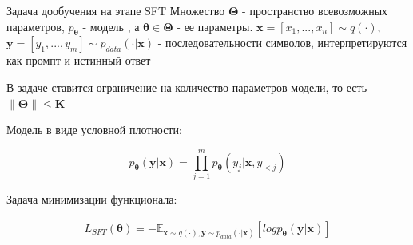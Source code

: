 \documentclass{beamer}
\newcommand{\bx}{\mathbf{x}}
\newcommand{\by}{\mathbf{y}}
\newcommand{\btheta}{\boldsymbol{\theta}}
\newcommand{\bTheta}{\boldsymbol{\Theta}}
\newcommand{\EE}{\mathbb{E}}
\begin{document}
\begin{frame}{Задача дообучения на этапе SFT}
    Множество $\bTheta$ - пространство всевозможных параметров, $p_{\btheta}$ - модель , а $\btheta \in \bTheta$ -  ее параметры. $\bx = [x_1, ..., x_n]\sim q(\cdot)$, $\by=[y_1, ..., y_m]\sim p_{data}(\cdot|\bx)$ - последовательности символов, интерпретируются как промпт и истинный ответ

\bigskip

В задаче ставится ограничение на количество параметров модели, то есть $\|\bTheta\| \le \mathbf{K}$

\bigskip

Модель в виде условной плотности:

$$p_{\btheta}(\by|\bx) = \prod_{j=1}^m p_{\btheta}(y_j|\bx, y_{<j})$$

Задача минимизации функционала:

\begin{align}
    L_{SFT}(\btheta) = -\EE_{\bx \sim q(\cdot), \by \sim p_{data}(\cdot|\bx)}[log p_{\btheta}(\by|\bx)]
\end{align}

\end{frame}
\end{document}
